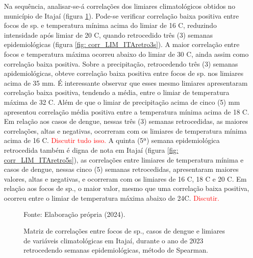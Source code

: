 \documentclass[
	12pt,				%
	openright,			%
	oneside,			%
	a4paper,			%
	english,			%
	french,				%
	spanish,			%
	brazil				%
	dvipsnames, table]{abntex2}
\begin{document}
Na sequência, analisar-se-á correlações dos limiares climatológicos obtidos no município de Itajaí (figura \ref{fig: matriz_corr_LIM_ITAretro}). Pode-se verificar correlação baixa positiva entre focos de  sp. e temperatura mínima acima do limiar de 16 C, reduzindo intensidade após limiar de 20 C, quando retrocedido três (3) semanas epidemiológicas (figura \ref{fig: corr_LIM_ITAretro3s}). A maior correlação entre focos e temperatura máxima ocorreu abaixo do limiar de 30 C, ainda assim como correlação baixa positiva. Sobre a precipitação, retrocedendo três (3) semanas apidemiológicas, obteve correlação baixa positiva entre focos de  sp. nos limiares acima de 35 mm.
É interessante observar que esses mesmo limiares apresentaram correlação baixa positiva, tendendo a média, entre o limiar de temperatura máxima de 32 C. Além de que o limiar de precipitação acima de cinco (5) mm apresentou correlação média positiva entre a temperatura mínima acima de 18 C. Em relação aos casos de dengue, nessas três (3) semanas retrocedidas, as maiores correlações, altas e negativas, ocorreram com os limiares de temperatura mínima acima de 16 C. \textcolor{red}{Discutir tudo isso.} A quinta (5ª) semana epidemiológica retrocedida também é digna de nota em Itajaí (figura \ref{fig: corr_LIM_ITAretro5s}), as correlações entre limiares de temperatura mínima e casos de dengue, nessas cinco (5) semanas retrocedidas, apresentaram maiores valores, altas e negativas, e ocorreram com os limiares de 16 C, 18 C e 20 C. Em relação aos focos de  sp., o maior valor, mesmo que uma correlação baixa positiva, ocorreu entre o limiar de temperatura máxima abaixo de 24C. \textcolor{red}{Discutir.}

\begin{figure}[htbp]
    \begin{center}
    \caption{Matriz de correlações entre focos de  sp., casos de dengue e limiares de variáveis climatológicas em Itajaí, durante o ano de 2023 retrocedendo semanas epidemiológicas, método de Spearman.}
    \label{fig: matriz_corr_LIM_ITAretro}
        \hfill
    \end{center}
    \small{Fonte: Elaboração própria (2024).}
\end{figure}
\end{document}
